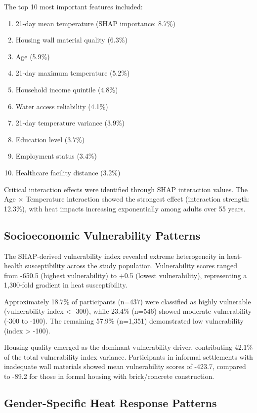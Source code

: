 \documentclass[11pt,a4paper]{article}
\begin{document}
The top 10 most important features included:
\begin{enumerate}
\item 21-day mean temperature (SHAP importance: 8.7\%)
\item Housing wall material quality (6.3\%)
\item Age (5.9\%)
\item 21-day maximum temperature (5.2\%)
\item Household income quintile (4.8\%)
\item Water access reliability (4.1\%)
\item 21-day temperature variance (3.9\%)
\item Education level (3.7\%)
\item Employment status (3.4\%)
\item Healthcare facility distance (3.2\%)
\end{enumerate}

Critical interaction effects were identified through SHAP interaction values. The Age × Temperature interaction showed the strongest effect (interaction strength: 12.3\%), with heat impacts increasing exponentially among adults over 55 years.

\subsection{Socioeconomic Vulnerability Patterns}

The SHAP-derived vulnerability index revealed extreme heterogeneity in heat-health susceptibility across the study population. Vulnerability scores ranged from -650.5 (highest vulnerability) to +0.5 (lowest vulnerability), representing a 1,300-fold gradient in heat susceptibility.

Approximately 18.7\% of participants (n=437) were classified as highly vulnerable (vulnerability index < -300), while 23.4\% (n=546) showed moderate vulnerability (-300 to -100). The remaining 57.9\% (n=1,351) demonstrated low vulnerability (index > -100).

Housing quality emerged as the dominant vulnerability driver, contributing 42.1\% of the total vulnerability index variance. Participants in informal settlements with inadequate wall materials showed mean vulnerability scores of -423.7, compared to -89.2 for those in formal housing with brick/concrete construction.

\subsection{Gender-Specific Heat Response Patterns}
\end{document}
